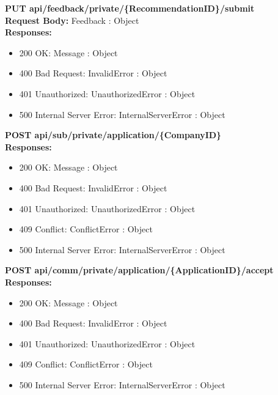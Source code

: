 \noindent\textbf{\color{titleColor}PUT api/feedback/private/\{RecommendationID\}/submit}
\vspace{2pt}
\\\textbf{\color{titleColor}Request Body:} Feedback : Object 
\vspace{4pt}
\\\textbf{\color{titleColor}Responses:} 
\begin{itemize}
    \item {\color{titleColor}200 OK:} Message : Object
    \item {\color{titleColor}400 Bad Request:} InvalidError : Object
    \item {\color{titleColor}401 Unauthorized:} UnauthorizedError : Object
    \item {\color{titleColor}500 Internal Server Error:} InternalServerError : Object
\end{itemize}
\vspace{10pt}
\noindent{\color{titleColor}\rule{0.8\linewidth}{0.2mm}}
\vspace{10pt}

\noindent\textbf{\color{titleColor}POST api/sub/private/application/\{CompanyID\}}
\vspace{2pt}
\\\textbf{\color{titleColor}Responses:} 
\begin{itemize}
    \item {\color{titleColor}200 OK:} Message : Object
    \item {\color{titleColor}400 Bad Request:} InvalidError : Object
    \item {\color{titleColor}401 Unauthorized:} UnauthorizedError : Object
    \item {\color{titleColor}409 Conflict:} ConflictError : Object
    \item {\color{titleColor}500 Internal Server Error:} InternalServerError : Object
\end{itemize}
\vspace{10pt}
\noindent{\color{titleColor}\rule{0.8\linewidth}{0.2mm}}
\vspace{10pt}

\noindent\textbf{\color{titleColor}POST api/comm/private/application/\{ApplicationID\}/accept}
\vspace{2pt}
\\\textbf{\color{titleColor}Responses:} 
\begin{itemize}
    \item {\color{titleColor}200 OK:} Message : Object
    \item {\color{titleColor}400 Bad Request:} InvalidError : Object
    \item {\color{titleColor}401 Unauthorized:} UnauthorizedError : Object
    \item {\color{titleColor}409 Conflict:} ConflictError : Object
    \item {\color{titleColor}500 Internal Server Error:} InternalServerError : Object
\end{itemize}
\vspace{10pt}
\noindent{\color{titleColor}\rule{0.8\linewidth}{0.2mm}}
\vspace{10pt}

